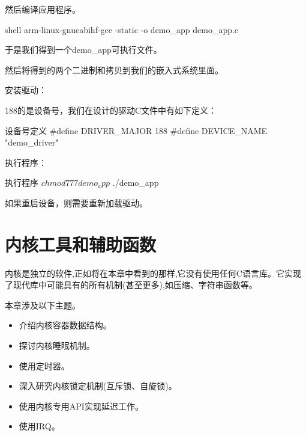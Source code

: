 \documentclass[lang=cn,newtx,10pt,scheme=chinese]{elegantbook}
\begin{document}
然后编译应用程序。

\begin{mycode}{shell}
arm-linux-gnueabihf-gcc -static -o demo_app demo_app.c
\end{mycode}

于是我们得到一个demo\_app可执行文件。

然后将得到的两个二进制和拷贝到我们的嵌入式系统里面。

安装驱动：


188的是设备号，我们在设计的驱动C文件中有如下定义：

\begin{mycode}{设备号定义}
#define    DRIVER_MAJOR     188
#define    DEVICE_NAME      "demo_driver"
\end{mycode}

执行程序：

\begin{mycode}{执行程序}
$ chmod 777 demo_app
$ ./demo_app
\end{mycode}

\begin{marker}
    如果重启设备，则需要重新加载驱动。
\end{marker}

\chapter{内核工具和辅助函数}

内核是独立的软件,正如将在本章中看到的那样,它没有使用任何C语言库。它实现了现代库中可能具有的所有机制(甚至更多),如压缩、字符串函数等。

本章涉及以下主题。

\begin{itemize}
    \item 介绍内核容器数据结构。
    \item 探讨内核睡眠机制。
    \item 使用定时器。
    \item 深入研究内核锁定机制(互斥锁、自旋锁)。
    \item 使用内核专用API实现延迟工作。
    \item 使用IRQ。
\end{itemize}
\end{document}
